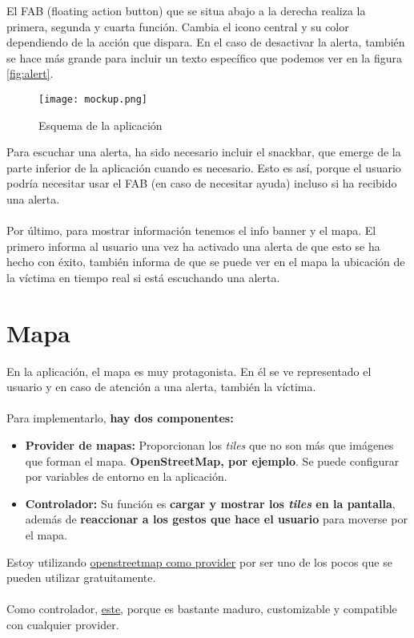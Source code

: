 El FAB (floating action button) que se situa abajo a la derecha realiza la primera, segunda y cuarta función. 
Cambia el icono central y su color dependiendo de la acción que dispara. En el caso de desactivar la alerta,
también se hace más grande para incluir un texto específico que podemos ver en la figura \ref{fig:alert}.

\begin{figure}[H]
	\centering	
	\texttt{[image: mockup.png]}
	\caption{Esquema de la aplicación}
	\end{figure}

Para escuchar una alerta, ha sido necesario incluir el snackbar, que emerge de la parte inferior de la aplicación cuando es necesario.
Esto es así, porque el usuario podría necesitar usar el FAB (en caso de necesitar ayuda) incluso si ha recibido una alerta. \\ \\

Por último, para mostrar información tenemos el info banner y el mapa. El primero informa al usuario una vez ha activado
una alerta de que esto se ha hecho con éxito, también informa de que se puede ver en el mapa la ubicación de la víctima en tiempo real
si está escuchando una alerta.

\section{Mapa}
En la aplicación, el mapa es muy protagonista. En él se ve representado el usuario y en caso de
atención a una alerta, también la víctima. \\ \\
Para implementarlo, \textbf{hay dos componentes:}
 \begin{itemize}
   \item \textbf{Provider de mapas:} Proporcionan los \textit{tiles} que no son más que imágenes que forman el mapa. \textbf{OpenStreetMap, por ejemplo}. Se puede configurar por variables de entorno en la aplicación.
   \item \textbf{Controlador:} Su función es \textbf{cargar y mostrar los \textit{tiles} en la pantalla}, además de \textbf{reaccionar a los gestos que hace el usuario} para moverse por el mapa. 
 \end{itemize}

 Estoy utilizando \href{https://wiki.openstreetmap.org/wiki/Tiles}{openstreetmap como provider} por ser uno de los pocos que se pueden utilizar gratuitamente. \\ \\
 Como controlador, \href{https://pub.dev/packages/map}{este}, porque es bastante maduro, customizable y compatible con cualquier provider.

